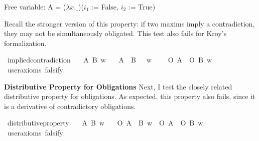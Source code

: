 \begin{isabellebody}
{  Free variable:
    A = ($\lambda x. \_$)($i_1$ := False, $i_2$ := True) \color{black}%
}%
\endisatagproof
{\isafoldproof}%
%
\isadelimproof
%
\endisadelimproof
%
\begin{isamarkuptext}%
Recall the stronger version of this property: if two maxims imply a
        contradiction, they may not be simultaneously obligated. This test also fails for Kroy's formalization.%
\end{isamarkuptext}\isamarkuptrue%
\isamarkupfalse%
\ implied{\isacharunderscore}contradiction{\isacharcolon}\isanewline
\ \ \ A\ B\ w\isanewline
\ \ \ {\isachardoublequoteopen}{\isacharparenleft}{\isacharparenleft}A\ \isactrlbold {\isasymand}\ B{\isacharparenright}\ \isactrlbold {\isasymrightarrow}\ \isactrlbold {\isasymbottom}{\isacharparenright}\ w{\isachardoublequoteclose}\isanewline
\ \ \ {\isachardoublequoteopen}\isactrlbold {\isasymnot}\ {\isacharparenleft}O\ {\isacharbraceleft}A{\isacharbraceright}\ \isactrlbold {\isasymand}\ O\ {\isacharbraceleft}B{\isacharbraceright}{\isacharparenright}\ w{\isachardoublequoteclose}\isanewline
\ \ \isamarkupfalse%
\ {\isacharbrackleft}user{\isacharunderscore}axioms{\isacharcomma}\ falsify{\isacharbrackright}%
\isadelimproof
\ %
\endisadelimproof
%
\isatagproof
{}\isamarkupfalse%
\isanewline
%
%
\endisatagproof
{\isafoldproof}%
%
\isadelimproof
%
\endisadelimproof
%
\begin{isamarkuptext}%
\noindent \textbf{Distributive Property for Obligations} Next, I test the closely related 
distributive property for obligations. As expected, this property also fails, since it is a derivative 
of contradictory obligations.%
\end{isamarkuptext}\isamarkuptrue%
\isamarkupfalse%
\ distributive{\isacharunderscore}property{\isacharcolon}\isanewline
\ \ \ A\ B\ w\isanewline
\ \ \ {\isachardoublequoteopen}O\ {\isacharbraceleft}A\ \isactrlbold {\isasymand}\ B{\isacharbraceright}\ w\ {\isasymequiv}\ O\ {\isacharbraceleft}A{\isacharbraceright}\ \isactrlbold {\isasymand}\ O\ {\isacharbraceleft}B{\isacharbraceright}\ w{\isachardoublequoteclose}\isanewline
\ \ \isamarkupfalse%
\ {\isacharbrackleft}user{\isacharunderscore}axioms{\isacharcomma}\ falsify{\isacharbrackright}%
\isadelimproof
\ %
\endisadelimproof
%
\isatagproof
{}\isamarkupfalse%
\isanewline
%
\end{isabellebody}
